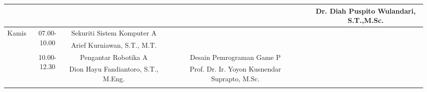 \begin{table}[]
\begin{tabular}{|c|c|ccccccc|}
                          &                              & \multicolumn{1}{c|}{}                                             & \multicolumn{1}{c|}{}                                              & \multicolumn{1}{c|}{}                                         & \multicolumn{1}{c|}{}                                                & \multicolumn{1}{c|}{}                                             & \multicolumn{1}{c|}{}                                              & Dr. Diah Puspito   Wulandari, S.T.,M.Sc.        \\ \hline
  \multirow{6}{*}{Kamis}  & \multirow{2}{*}{07.00-10.00} & \multicolumn{1}{c|}{Sekuriti Sistem   Komputer A}                 & \multicolumn{1}{c|}{}                                              & \multicolumn{1}{c|}{}                                         & \multicolumn{1}{c|}{}                                                & \multicolumn{1}{c|}{}                                             & \multicolumn{1}{c|}{}                                              &                                                 \\ \cline{3-9} 
                          &                              & \multicolumn{1}{c|}{Arief Kurniawan, S.T., M.T.}                  & \multicolumn{1}{c|}{}                                              & \multicolumn{1}{c|}{}                                         & \multicolumn{1}{c|}{}                                                & \multicolumn{1}{c|}{}                                             & \multicolumn{1}{c|}{}                                              &                                                 \\ \cline{2-9} 
                          & \multirow{2}{*}{10.00-12.30} & \multicolumn{1}{c|}{Pengantar Robotika A}                         & \multicolumn{1}{c|}{}                                              & \multicolumn{1}{c|}{}                                         & \multicolumn{1}{c|}{Desain Pemrograman   Game P}                     & \multicolumn{1}{c|}{}                                             & \multicolumn{1}{c|}{}                                              &                                                 \\ \cline{3-9} 
                          &                              & \multicolumn{1}{c|}{Dion Hayu Fandiantoro, S.T., M.Eng.}          & \multicolumn{1}{c|}{}                                              & \multicolumn{1}{c|}{}                                         & \multicolumn{1}{c|}{Prof. Dr. Ir. Yoyon   Kusnendar Suprapto, M.Sc.} & \multicolumn{1}{c|}{}                                             & \multicolumn{1}{c|}{}                                              &                                                 \\ \cline{2-9} 

\end{tabular}
\end{table}
